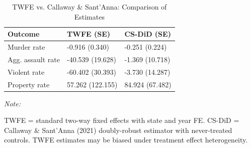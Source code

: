 \begin{table}[!h]
\centering
\caption{\label{tab:tab:twfe_comp}TWFE vs. Callaway \& Sant'Anna: Comparison of Estimates}
\centering
\begin{threeparttable}
\begin{tabular}[t]{lll}
\toprule
Outcome & TWFE (SE) & CS-DiD (SE)\\
\midrule
Murder rate & -0.916
(0.340) & -0.251
(0.224)\\
Agg. assault rate & -40.539
(19.628) & -1.369
(10.718)\\
Violent rate & -60.402
(30.393) & -3.730
(14.287)\\
Property rate & 57.262
(122.155) & 84.924
(67.482)\\
\bottomrule
\end{tabular}
\begin{tablenotes}
\item \textit{Note: } 
\item TWFE = standard two-way fixed effects with state and year FE. CS-DiD = Callaway & Sant'Anna (2021) doubly-robust estimator with never-treated controls. TWFE estimates may be biased under treatment effect heterogeneity.
\end{tablenotes}
\end{threeparttable}
\end{table}

